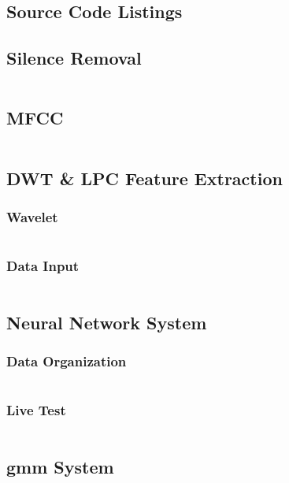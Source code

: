 \documentclass[12pt, a4paper, twoside]{report}
\begin{document}
\begin{appendices}
\chapter{Source Code Listings}

\section{Silence Removal}
\inputminted[linenos, numbersep=5pt, frame=single, breaklines=true, tabsize=2]
{Matlab}{codes/s-remove.m}

\section{MFCC}
\inputminted[linenos, numbersep=5pt, frame=single, breaklines=true, tabsize=2]
{Matlab}{codes/mfcc.m}

\section{DWT \& LPC Feature Extraction}
\subsection{Wavelet}
\inputminted[linenos, numbersep=5pt, frame=single, breaklines=true, tabsize=2]
{Matlab}{codes/dwt-wavelet.m}
\subsection{Data Input}
\inputminted[linenos, numbersep=5pt, frame=single, breaklines=true, tabsize=2]
{Matlab}{codes/dwt-lpc.m}

\section{Neural Network System}
\subsection{Data Organization}
\inputminted[linenos, numbersep=5pt, frame=single, breaklines=true, tabsize=2]
{Matlab}{codes/nn-get-data.m}
\subsection{Live Test}
\inputminted[linenos, numbersep=5pt, frame=single, breaklines=true, tabsize=2]
{Matlab}{codes/nn-live-cont.m}

\section{\acrshort{gmm} System}
\inputminted[linenos, numbersep=5pt, frame=single, breaklines=true, tabsize=2]
{Matlab}{codes/gmm.m}


\end{appendices}
\end{document}
